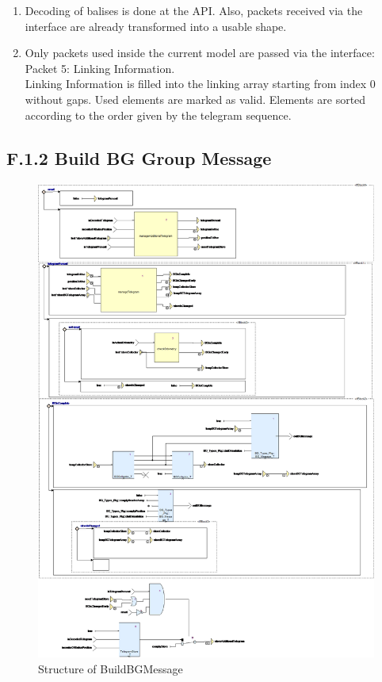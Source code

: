 \documentclass{template/openetcs_report}
\begin{document}
\begin{enumerate}
\item Decoding of balises is done at the API. Also, packets received via the interface are already transformed into a usable shape.
\item Only packets used inside the current model are passed via the interface:\\
Packet 5: Linking Information.\\
Linking Information is filled into the linking array starting from index 0 without gaps. Used elements are marked as valid. Elements are sorted according to the order given by the telegram sequence.
\end{enumerate}



\subsection{F.1.2 Build BG Group Message}

\begin{figure}[hbtp]
\centering
\includegraphics[width=\textwidth]{../images/BuildBGMessage_diagram.png}
\caption{Structure of BuildBGMessage}
\end{figure}
\end{document}
